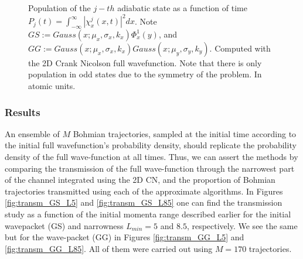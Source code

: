 \documentclass[11pt, a4paper]{article} %
\begin{document}
\begin{figure}[p]
  \caption{ Population of the $j-th$ adiabatic state as a function of time $P_j(t)=\int_{-\infty}^\infty |\chi^j_x(x,t)|^2dx $. Note $GS:=Gauss(x;\mu_x, \sigma_x, k_x)\Phi^1_x(y)$, and $GG:=Gauss(x;\mu_x, \sigma_x, k_x)Gauss(x;\mu_y, \sigma_y, k_y)$. Computed with the 2D Crank Nicolson full wavefunction. Note that there is only population in odd states due to the symmetry of the problem. In atomic units.}
  \label{fig:popsInTime}
\end{figure}
\newpage


\subsubsection{Results}\vspace{-0.3cm}
An ensemble of $M$ Bohmian trajectories, sampled at the initial time according to the initial full wavefunction's probability density, should replicate the probability density of the full wave-function at all times. Thus, we can assert the methods by comparing the transmission of the full wave-function through the narrowest part of the channel integrated using the 2D CN, and the proportion of Bohmian trajectories transmitted using each of the approximate algorithms. In Figures \ref{fig:transm_GS_L5} and \ref{fig:transm_GS_L85} one can find the transmission study as a function of the initial momenta range described earlier for the initial wavepacket (GS) and narrowness $L_{min}=5$ and $8.5$, respectively. We see the same but for the wave-packet (GG) in Figures \ref{fig:transm_GG_L5} and \ref{fig:transm_GG_L85}. All of them were carried out using $M=170$ trajectories.
\end{document}
